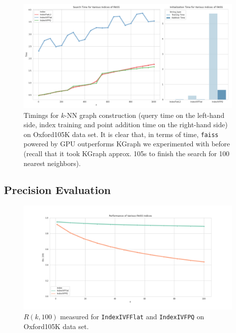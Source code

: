 \begin{frame}

\begin{figure}
\centering
\includegraphics[width=0.85\linewidth,height=0.65\textheight]{../images/knn/timings}
\caption{Timings for $k$-NN graph construction (query time on the left-hand side, index training and point addition time on the right-hand side) on Oxford105K data set. It is clear that, in terms of time, \texttt{faiss} powered by GPU outperforms KGraph \cite{Dong2011} we experimented with before (recall that it took KGraph approx. 105s to finish the search for 100 nearest neighbors).}
\label{fig:knn_timing}
\end{figure}
\end{frame}


\subsection{Precision Evaluation}


\begin{frame}

\begin{figure}
\centering
\includegraphics[width=0.85\linewidth,height=0.65\textheight]{../images/knn/precision}
\caption{$R(k, 100)$ measured for \texttt{IndexIVFFlat} and \texttt{IndexIVFPQ} on Oxford105K data set.}
\label{fig:knn_precision}
\end{figure}
	
\end{frame}


